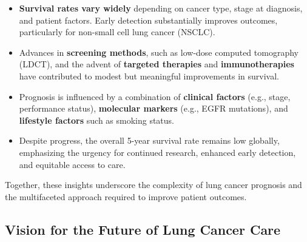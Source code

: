 \begin{itemize}
    \item \textbf{Survival rates vary widely} depending on cancer type, stage at diagnosis, and 
    patient factors. Early detection substantially improves outcomes, particularly for non-small 
    cell lung cancer (NSCLC).

    \item Advances in \textbf{screening methods}, such as low-dose computed tomography (LDCT), and 
    the advent of \textbf{targeted therapies} and \textbf{immunotherapies} have contributed to 
    modest but meaningful improvements in survival.
    
    \item Prognosis is influenced by a combination of \textbf{clinical factors} (e.g., stage, 
    performance status), \textbf{molecular markers} (e.g., EGFR mutations), and 
    \textbf{lifestyle factors} such as smoking status.

    \item Despite progress, the overall 5-year survival rate remains low globally, emphasizing the 
    urgency for continued research, enhanced early detection, and equitable access to care.
\end{itemize}

Together, these insights underscore the complexity of lung cancer prognosis and the multifaceted 
approach required to improve patient outcomes.


\subsection{Vision for the Future of Lung Cancer Care}

